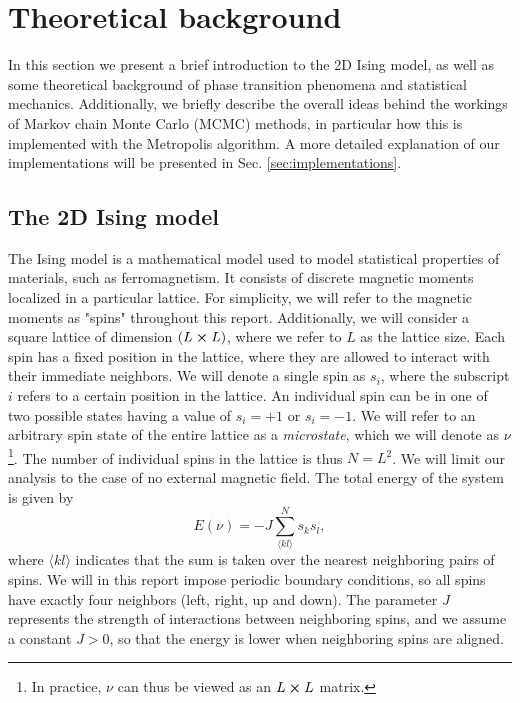 \section{Theoretical background}\label{sec:theory}

In this section we present a brief introduction to the 2D Ising model, as well as some theoretical background of phase transition phenomena and statistical mechanics. Additionally, we briefly describe the overall ideas behind the workings of Markov chain Monte Carlo (MCMC) methods, in particular how this is implemented with the Metropolis algorithm. A more detailed explanation of our implementations will be presented in Sec. \ref{sec:implementations}.    

\subsection{The 2D Ising model}\label{subsec_theory:ising_2d}
The Ising model is a mathematical model used to model statistical properties of materials, such as ferromagnetism. It consists of discrete magnetic moments localized in a particular lattice. For simplicity, we will refer to the magnetic moments as "spins" throughout this report. Additionally, we will consider a square lattice of dimension $(L\cross L)$, where we refer to $L$ as the lattice size. Each spin has a fixed position in the lattice, where they are allowed to interact with their immediate neighbors. We will denote a single spin as $s_i$, where the subscript $i$ refers to a certain position in the lattice. An individual spin can be in one of two possible states having a value of $s_i=+1$ or $s_i=-1$. We will refer to an arbitrary spin state of the entire lattice as a \textit{microstate}, which we will denote as $\nu$\footnote{In practice, $\nu$ can thus be viewed as an $L\cross L$ matrix.}. The number of individual spins in the lattice is thus $N=L^2$. We will limit our analysis to the case of no external magnetic field. The total energy of the system is given by 
\begin{equation} \label{eq:energy}
    E(\nu) = -J \sum_{\langle kl \rangle}^N s_k s_l,
\end{equation}
where $\langle kl\rangle$ indicates that the sum is taken over the nearest neighboring pairs of spins. We will in this report impose periodic boundary conditions, so all spins have exactly four neighbors (left, right, up and down). The parameter $J$ represents the strength of interactions between neighboring spins, and we assume a constant $J>0$, so that the energy is lower when neighboring spins are aligned. 

